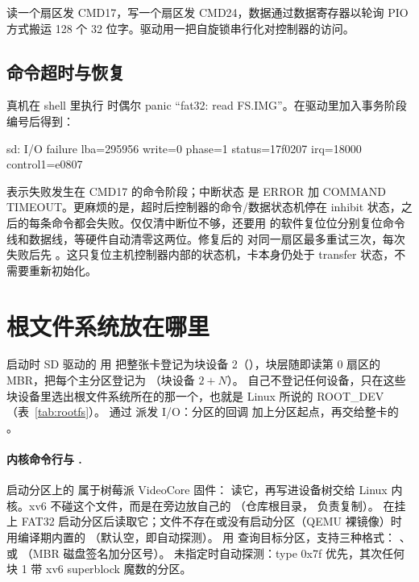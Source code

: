 读一个扇区发 CMD17，写一个扇区发 CMD24，数据通过数据寄存器以轮询 PIO 方式搬运 128 个 32 位字。驱动用一把自旋锁串行化对控制器的访问。

\subsection{命令超时与恢复}

真机在 shell 里执行  时偶尔 panic “fat32: read FS.IMG”。在驱动里加入事务阶段编号后得到：

\begin{txtcode}
sd: I/O failure lba=295956 write=0 phase=1 status=17f0207 irq=18000 control1=e0807
\end{txtcode}

 表示失败发生在 CMD17 的命令阶段；中断状态  是 ERROR 加 COMMAND TIMEOUT。更麻烦的是，超时后控制器的命令/数据状态机停在 inhibit 状态，之后的每条命令都会失败。仅仅清中断位不够，还要用  的软件复位位分别复位命令线和数据线，等硬件自动清零这两位。修复后的  对同一扇区最多重试三次，每次失败后先 。这只复位主机控制器内部的状态机，卡本身仍处于 transfer 状态，不需要重新初始化。

\section{根文件系统放在哪里}
\label{sec:rootfs}

启动时 SD 驱动的  用  把整张卡登记为块设备 2（），块层随即读第 0 扇区的 MBR，把每个主分区登记为 （块设备 $2+N$）。 自己不登记任何设备，只在这些块设备里选出根文件系统所在的那一个，也就是 Linux 所说的 ROOT\_DEV（表~\ref{tab:rootfs}）。 通过  派发 I/O：分区的回调  加上分区起点，再交给整卡的 。

\paragraph{内核命令行与 .} 启动分区上的  属于树莓派 VideoCore
固件： 读它，再写进设备树交给 Linux 内核。xv6 不碰这个文件，而是在旁边放自己的
（仓库根目录， 负责复制）。
在挂上 FAT32 启动分区后读取它；文件不存在或没有启动分区（QEMU 裸镜像）时用编译期内置的
（默认空，即自动探测）。
 用  查询目标分区，支持三种格式：
、 或 （MBR 磁盘签名加分区号）。
未指定时自动探测：type 0x7f 优先，其次任何块 1 带 xv6 superblock 魔数的分区。

